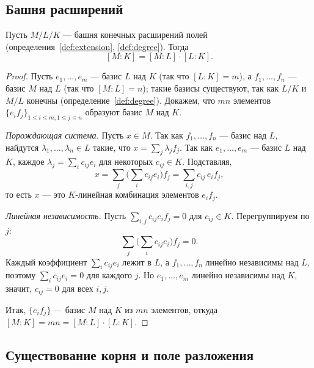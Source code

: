 \documentclass[12pt]{article}
\begin{document}
    \subsection{Башня расширений}
    
    \begin{theorem}\label{thm:tower}
    	Пусть $M/L/K$ --- башня конечных расширений полей (определения~\ref{def:extension}, \ref{def:degree}). Тогда
    	\[
    	[M:K] = [M:L] \cdot [L:K].
    	\]
    \end{theorem}
    \begin{proof}
    	Пусть $e_1, \ldots, e_m$ --- базис $L$ над $K$ (так что $[L:K]=m$), а $f_1, \ldots, f_n$ --- базис $M$ над $L$ (так что $[M:L]=n$); такие базисы существуют, так как $L/K$ и $M/L$ конечны (определение~\ref{def:degree}). Докажем, что $mn$ элементов $\{e_i f_j\}_{1\leqslant i \leqslant m, 1 \leqslant j \leqslant n}$ образуют базис $M$ над $K$.
    
    	\emph{Порождающая система.} Пусть $x \in M$. Так как $f_1,\ldots,f_n$ --- базис над $L$, найдутся $\lambda_1,\ldots,\lambda_n \in L$ такие, что $x = \sum_j \lambda_j f_j$. Так как $e_1,\ldots,e_m$ --- базис $L$ над $K$, каждое $\lambda_j = \sum_i c_{ij} e_i$ для некоторых $c_{ij} \in K$. Подставляя,
    	\[
    	x = \sum_j \Big(\sum_i c_{ij} e_i\Big) f_j = \sum_{i,j} c_{ij} \, e_i f_j,
    	\]
    	то есть $x$ --- это $K$-линейная комбинация элементов $e_i f_j$.
    
    	\emph{Линейная независимость.} Пусть $\sum_{i,j} c_{ij} e_i f_j = 0$ для $c_{ij} \in K$. Перегруппируем по $j$:
    	\[
    	\sum_j \Big(\sum_i c_{ij} e_i\Big) f_j = 0.
    	\]
    	Каждый коэффициент $\sum_i c_{ij} e_i$ лежит в $L$, а $f_1,\ldots,f_n$ линейно независимы над $L$, поэтому $\sum_i c_{ij} e_i = 0$ для каждого $j$. Но $e_1,\ldots,e_m$ линейно независимы над $K$, значит, $c_{ij} = 0$ для всех $i,j$.
    
    	Итак, $\{e_i f_j\}$ --- базис $M$ над $K$ из $mn$ элементов, откуда $[M:K] = mn = [M:L]\cdot[L:K]$.
    \end{proof}
    
    \subsection{Существование корня и поле разложения}
    
\end{document}
